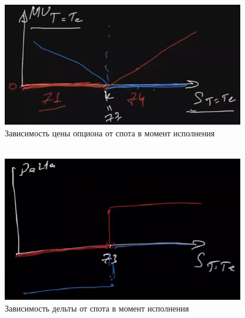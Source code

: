 \documentclass{article}
\begin{document}
\begin{center}
\includegraphics[width=300pt]{picture_1.png}\\
\caption{Зависимость цены опциона от спота в момент исполнения}\\
\bigskip
\bigskip
\includegraphics[width=300pt]{picture_2.png}\\
\caption{Зависимость дельты от спота в момент исполнения}\\

\end{center}    
\end{document}
